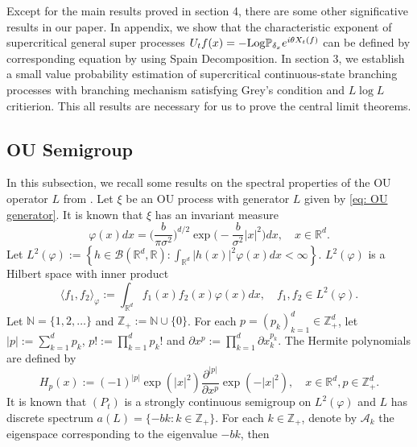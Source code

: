\documentclass[12pt,a4paper]{amsart}
\theoremstyle{plain}
\theoremstyle{definition}
\numberwithin{equation}{section}
\begin{document}
 Except for the main results proved in section 4, there are some other significative results in our paper. In appendix, we show that the characteristic exponent of supercritical general super processes $U_t f(x)=-{\rm Log} \mathbb{P}_{\delta_x}e^{i\theta X_t(f)}$ can be defined by corresponding equation by using Spain Decomposition. In section 3, we establish a small value probability estimation of supercritical continuous-state branching processes with branching mechanism satisfying Grey's condition and $L\log L$ critierion. This all results are necessary for us to prove the central limit theorems.


\subsection{OU Semigroup}
    In this subsection, we recall some results on the spectral properties of the OU operator $L$ from \cite{GD}.
    Let $\xi$ be an OU process with generator $L$ given by \eqref{eq: OU generator}.
    It is known that $\xi$ has an invariant measure
\begin{equation}
\label{invariantdensity}
    \varphi(x)dx
    =\Big (\frac{b}{\pi \sigma^2}\Big )^{d/2}\exp \Big(-\frac{b}{\sigma^2}|x|^2 \Big)dx,
    \quad x\in \mathbb R^d.
\end{equation}
    Let $L^2(\varphi):= \left\{ h  \in \mathcal B(\mathbb R^d, \mathbb R): \int_{\mathbb R^d} |h(x)|^2 \varphi(x) dx < \infty \right\}$. $L^2(\varphi)$ is a Hilbert space with inner product
\begin{equation}
    \langle f_1, f_2 \rangle_{\varphi}
    := \int_{\mathbb R^d}f_1(x)f_2(x)\varphi(x) dx, \quad f_1,f_2 \in L^2(\varphi).
\end{equation}
     Let $\mathbb N = \{1,2,\dots\}$ and $\mathbb Z_+ := \mathbb N\cup\{0\}$.
     For each $p = (p_k)_{k = 1}^d \in \mathbb{Z}_+^{d}$,
    let $|p|:=\sum_{k=1}^d p_k$, $p!:= \prod_{k= 1}^d p_k !$ and $\partial x^p:= \prod_{k = 1}^d\partial x_k^{p_k}$.
    The Hermite polynomials are defined by
\begin{equation}
    H_p(x)
    :=(-1)^{|p|}\exp(|x|^2) \frac{\partial ^{|p|}}{\partial x^p} \exp(-|x|^2) ,
    \quad x\in \mathbb R^d,
    p \in \mathbb{Z}_+^{d}.
\end{equation}
    It is known that $(P_t)$ is a strongly continuous semigroup on $L^2(\varphi)$ and $L$ has
    discrete spectrum $a(L)= \{-bk: k \in \mathbb Z_+\}$.
    For each $k \in \mathbb Z_+$, denote by $\mathcal{A}_k$ the eigenspace corresponding to the eigenvalue $-bk$, then
\end{document}
